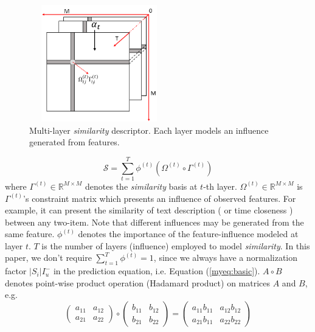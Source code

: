 \documentclass[conference]{IEEEtran}
\begin{document}
\begin{figure}[t]
\centering
\includegraphics[height=2.0in, width=2.4in]{mlsd}
\caption{Multi-layer \emph{similarity} descriptor. Each layer models an influence generated from features. }
\label{g:mlsd}
\end{figure}

\begin{equation}\label{myeq:geneconstrainsim}
 \mathcal{S} =\sum_{t=1}^{T}\phi^{(t)}(\Omega^{(t)} \circ \Gamma^{(t)})
\end{equation}
where $\Gamma^{(t)}\in \mathbb{R}^{M\times M}$ denotes the \emph{similarity} basis at $t$-th layer. $\Omega^{(t)} \in \mathbb{R}^{M\times M}$ is $\Gamma^{(t)}$'s constraint matrix which presents an influence of observed features.  For example, it can present the similarity of text description ( or time closeness ) between any two-item. Note that different influences may be generated from the same feature. $\phi^{(t)}$ denotes the importance of the feature-influence modeled at layer $t$. $T$ is the number of layers (influence) employed to model \emph{similarity}. In this paper, we don't require $\sum_{t=1}^{T}\phi^{(t)}=1$, since we always have a normalization factor $|S_i|I_u^-$ in the prediction equation, i.e. Equation (\ref{myeq:basic}). $A \circ B$ denotes point-wise product operation (Hadamard product) on matrices $A$ and $B$, e.g.
$$\begin{pmatrix}
a_{11} &  a_{12}\\
a_{21} &  a_{22}
\end{pmatrix} \circ
\begin{pmatrix}
b_{11} &  b_{12}\\
b_{21} &  b_{22}
\end{pmatrix} =
\begin{pmatrix}
a_{11}b_{11} &  a_{12}b_{12}\\
a_{21}b_{11}&  a_{22}b_{22}
\end{pmatrix} $$
\end{document}
